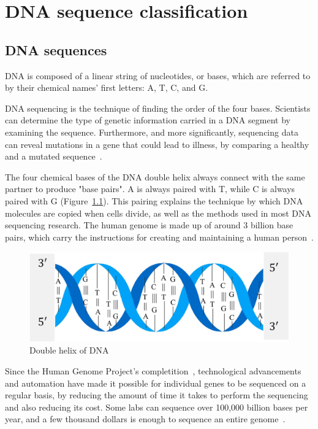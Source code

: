 \chapter{DNA sequence classification} \label{sec:dna_sequences}

\section{DNA sequences} \label{subsec:what_are_dna_sequences}

\gls{DNA} is composed of a linear string of nucleotides, or bases, which are referred to by their chemical names' first letters: \gls{A}, \gls{T}, \gls{C}, and \gls{G}. 

\gls{DNA} sequencing is the technique of finding the order of the four bases. Scientists can determine the type of genetic information carried in a \gls{DNA} segment by examining the sequence. Furthermore, and more significantly, sequencing data can reveal mutations in a gene that could lead to illness, by comparing a healthy and a mutated sequence~\cite{2020DNASheet}.

The four chemical bases of the \gls{DNA} double helix always connect with the same partner to produce "base pairs". \gls{A} is always paired with \gls{T}, while \gls{C} is always paired with \gls{G} (Figure~\ref{fig:dna}). This pairing explains the technique by which \gls{DNA} molecules are copied when cells divide, as well as the methods used in most \gls{DNA} sequencing research. The human \gls{genome} is made up of around 3 billion base pairs, which carry the instructions for creating and maintaining a human person~\cite{2020DNASheet}.

\begin{figure}[htbp]
    \centering
    \includegraphics[width=0.5\linewidth]{Chapters/Figures/dna.jpg}
    \caption{Double helix of DNA~\cite{Yang2020ReviewDNA}}
    \label{fig:dna}
\end{figure}

Since the Human Genome Project's completition~\cite{TheProject}, technological advancements and automation have made it possible for individual genes to be sequenced on a regular basis, by reducing the amount of time it takes to perform the sequencing and also reducing its cost. Some labs can sequence over 100,000 billion bases per year, and a few thousand dollars is enough to sequence an entire \gls{genome}~\cite{2020DNASheet}. 



